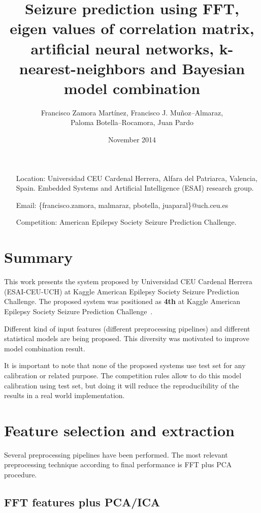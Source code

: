 \documentclass[a4paper,english,twoside]{article}
\author{Francisco Zamora Martínez, Francisco J. Mu\~noz--Almaraz,\\
  Paloma Botella--Rocamora, Juan Pardo}
\date{November 2014}
\title{Seizure prediction using FFT, eigen values of correlation matrix,
  artificial neural networks, k-nearest-neighbors and Bayesian model combination}
\begin{document}
\maketitle

\begin{itemize}
\item[Location:] Universidad CEU Cardenal Herrera, Alfara del Patriarca,
  Valencia, Spain. Embedded Systems and Artificial Intelligence (ESAI) research
  group.
\item[Email:] \{francisco.zamora, malmaraz, pbotella, juaparal\}@uch.ceu.es
\item[Competition:] American Epilepsy Society Seizure Prediction Challenge.
\end{itemize}

\section{Summary}\label{summary}

This work presents the system proposed by Universidad CEU Cardenal
Herrera (ESAI-CEU-UCH) at Kaggle American Epilepsy Society Seizure
Prediction Challenge. The proposed system was positioned as \textbf{4th}
at Kaggle American Epilepsy Society Seizure Prediction Challenge~\cite{kaggle}.

Different kind of input features (different preprocessing pipelines) and
different statistical models are being proposed. This diversity was motivated to
improve model combination result.

It is important to note that none of the proposed systems use test set
for any calibration or related purpose. The competition rules allow to do this
model calibration using test set, but doing it will reduce the
reproducibility of the results in a real world implementation.

\section{Feature selection and
  extraction}\label{feature-selection-and-extraction}

Several preprocessing pipelines have been performed. The  most relevant
preprocessing technique according to final performance is  FFT plus
PCA procedure.

\subsection{FFT features plus PCA/ICA}\label{fft-features-plus-pcaica}
\end{document}
